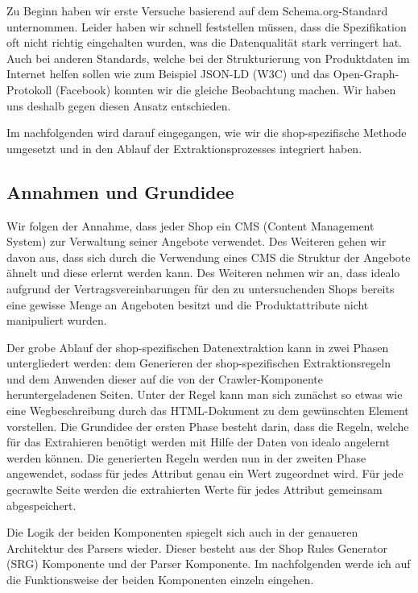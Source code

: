Zu Beginn haben wir erste Versuche basierend auf dem Schema.org-Standard unternommen.
Leider haben wir schnell feststellen müssen, dass die Spezifikation oft nicht richtig eingehalten wurden, was die
Datenqualität stark verringert hat.
Auch bei anderen Standards, welche bei der Strukturierung von Produktdaten im Internet helfen sollen wie zum Beispiel
JSON-LD (W3C) und das Open-Graph-Protokoll (Facebook) konnten wir die gleiche Beobachtung machen.
Wir haben uns deshalb gegen diesen Ansatz entschieden.

Im nachfolgenden wird darauf eingegangen, wie wir die shop-spezifische Methode umgesetzt und in den Ablauf der
Extraktionsprozesses integriert haben.

\subsection{Annahmen und Grundidee}
\label{subsec:annahmen-und-grundidee}

Wir folgen der Annahme, dass jeder Shop ein CMS (Content Management System) zur Verwaltung seiner Angebote verwendet.
Des Weiteren gehen wir davon aus, dass sich durch die Verwendung eines CMS die Struktur der Angebote ähnelt und diese
erlernt werden kann.
Des Weiteren nehmen wir an, dass idealo aufgrund der Vertragsvereinbarungen für den zu untersuchenden Shops bereits
eine gewisse Menge an Angeboten besitzt und die Produktattribute nicht manipuliert wurden.

Der grobe Ablauf der shop-spezifischen Datenextraktion kann in zwei Phasen untergliedert werden:
dem Generieren der shop-spezifischen Extraktionsregeln und dem Anwenden dieser auf die von der Crawler-Komponente
heruntergeladenen Seiten.
Unter der Regel kann man sich zunächst so etwas wie eine Wegbeschreibung durch das HTML-Dokument zu dem gewünschten
Element vorstellen.
Die Grundidee der ersten Phase besteht darin, dass die Regeln, welche für das Extrahieren benötigt werden mit
Hilfe der Daten von idealo angelernt werden können.
Die generierten Regeln werden nun in der zweiten Phase angewendet, sodass für jedes Attribut genau ein Wert
zugeordnet wird.
Für jede gecrawlte Seite werden die extrahierten Werte für jedes Attribut gemeinsam abgespeichert.

Die Logik der beiden Komponenten spiegelt sich auch in der genaueren Architektur des Parsers wieder.
Dieser besteht aus der Shop Rules Generator (SRG) Komponente und der Parser Komponente.
Im nachfolgenden werde ich auf die Funktionsweise der beiden Komponenten einzeln eingehen.

